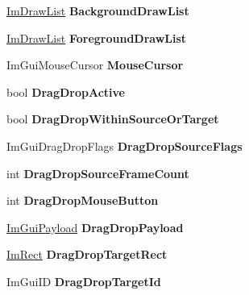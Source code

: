 \begin{DoxyCompactItemize}
\hyperlink{structImDrawList}{Im\+Draw\+List} {\bfseries Background\+Draw\+List}
\item 
\mbox{\label{structImGuiContext_af351be69c6a4ea0f3ade0ac69cd127aa}} 
\hyperlink{structImDrawList}{Im\+Draw\+List} {\bfseries Foreground\+Draw\+List}
\item 
\mbox{\label{structImGuiContext_ab60730c7f9f601fd0b22dac060a822e3}} 
Im\+Gui\+Mouse\+Cursor {\bfseries Mouse\+Cursor}
\item 
\mbox{\label{structImGuiContext_a2de4fe755e10ccfee6b06aa84b3d9c0d}} 
bool {\bfseries Drag\+Drop\+Active}
\item 
\mbox{\label{structImGuiContext_a9d9b14fca32e29c12cdf9a0ad83f7657}} 
bool {\bfseries Drag\+Drop\+Within\+Source\+Or\+Target}
\item 
\mbox{\label{structImGuiContext_a61d6d8dbd670e2f4e70d50248caac012}} 
Im\+Gui\+Drag\+Drop\+Flags {\bfseries Drag\+Drop\+Source\+Flags}
\item 
\mbox{\label{structImGuiContext_a03bca20dc62ae39fb6c7eb047babf12c}} 
int {\bfseries Drag\+Drop\+Source\+Frame\+Count}
\item 
\mbox{\label{structImGuiContext_a0efbd88ee7334cb922fccb1487ba496c}} 
int {\bfseries Drag\+Drop\+Mouse\+Button}
\item 
\mbox{\label{structImGuiContext_a35f39762769e30c083758c21fbde3e78}} 
\hyperlink{structImGuiPayload}{Im\+Gui\+Payload} {\bfseries Drag\+Drop\+Payload}
\item 
\mbox{\label{structImGuiContext_a9c0b11750492d186c9b96b75d824e91b}} 
\hyperlink{structImRect}{Im\+Rect} {\bfseries Drag\+Drop\+Target\+Rect}
\item 
\mbox{\label{structImGuiContext_af8641ca16b62736c6af16364e65666ab}} 
Im\+Gui\+ID {\bfseries Drag\+Drop\+Target\+Id}
\item 
\mbox{\label{structImGuiContext_a7342ae93b69ed2c9d3ba08d184df2827}} 

\end{DoxyCompactItemize}
